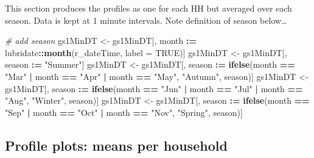 \documentclass[]{article}
\newenvironment{Shaded}{\begin{snugshade}}{\end{snugshade}}
\newcommand{\KeywordTok}[1]{\textcolor[rgb]{0.13,0.29,0.53}{\textbf{#1}}}
\newcommand{\DataTypeTok}[1]{\textcolor[rgb]{0.13,0.29,0.53}{#1}}
\newcommand{\StringTok}[1]{\textcolor[rgb]{0.31,0.60,0.02}{#1}}
\newcommand{\CommentTok}[1]{\textcolor[rgb]{0.56,0.35,0.01}{\textit{#1}}}
\newcommand{\OtherTok}[1]{\textcolor[rgb]{0.56,0.35,0.01}{#1}}
\newcommand{\OperatorTok}[1]{\textcolor[rgb]{0.81,0.36,0.00}{\textbf{#1}}}
\newcommand{\ErrorTok}[1]{\textcolor[rgb]{0.64,0.00,0.00}{\textbf{#1}}}
\newcommand{\NormalTok}[1]{#1}
\begin{document}
This section produces the profiles as one for each HH but averaged over
each season. Data is kept at 1 minute intervals. Note definition of
season below\ldots{}

\begin{Shaded}
\begin{Highlighting}[]
\CommentTok{# add season}
\NormalTok{gs1MinDT <-}\StringTok{ }\NormalTok{gs1MinDT[, month }\OperatorTok{:}\ErrorTok{=}\StringTok{ }\NormalTok{lubridate}\OperatorTok{::}\KeywordTok{month}\NormalTok{(r_dateTime, }\DataTypeTok{label =} \OtherTok{TRUE}\NormalTok{)]}
\NormalTok{gs1MinDT <-}\StringTok{ }\NormalTok{gs1MinDT[, season }\OperatorTok{:}\ErrorTok{=}\StringTok{ "Summer"}\NormalTok{]}
\NormalTok{gs1MinDT <-}\StringTok{ }\NormalTok{gs1MinDT[, season }\OperatorTok{:}\ErrorTok{=}\StringTok{ }\KeywordTok{ifelse}\NormalTok{(month }\OperatorTok{==}\StringTok{ "Mar"} \OperatorTok{|}
\StringTok{                                              }\NormalTok{month }\OperatorTok{==}\StringTok{ "Apr"} \OperatorTok{|}
\StringTok{                                              }\NormalTok{month }\OperatorTok{==}\StringTok{ "May"}\NormalTok{, }\StringTok{"Autumn"}\NormalTok{, season)]}
\NormalTok{gs1MinDT <-}\StringTok{ }\NormalTok{gs1MinDT[, season }\OperatorTok{:}\ErrorTok{=}\StringTok{ }\KeywordTok{ifelse}\NormalTok{(month }\OperatorTok{==}\StringTok{ "Jun"} \OperatorTok{|}
\StringTok{                                              }\NormalTok{month }\OperatorTok{==}\StringTok{ "Jul"} \OperatorTok{|}
\StringTok{                                              }\NormalTok{month }\OperatorTok{==}\StringTok{ "Aug"}\NormalTok{, }\StringTok{"Winter"}\NormalTok{, season)]}
\NormalTok{gs1MinDT <-}\StringTok{ }\NormalTok{gs1MinDT[, season }\OperatorTok{:}\ErrorTok{=}\StringTok{ }\KeywordTok{ifelse}\NormalTok{(month }\OperatorTok{==}\StringTok{ "Sep"} \OperatorTok{|}
\StringTok{                                              }\NormalTok{month }\OperatorTok{==}\StringTok{ "Oct"} \OperatorTok{|}
\StringTok{                                              }\NormalTok{month }\OperatorTok{==}\StringTok{ "Nov"}\NormalTok{, }\StringTok{"Spring"}\NormalTok{, season)]}
\end{Highlighting}
\end{Shaded}

\subsection{Profile plots: means per
household}\label{profile-plots-means-per-household}
\end{document}
